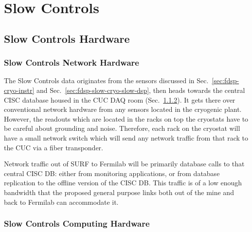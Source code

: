 \section{Slow Controls}
\label{sec:fdsp-slow-cryo-ctrl}




\subsection{Slow Controls Hardware}
\label{sec:fdsp-slow-cryo-hdwr}

\subsubsection{Slow Controls Network Hardware}
\label{sec:fdsp-slow-cryo-slow-network}
The Slow Controls data originates from the sensors discussed in
Sec.~\ref{sec:fdsp-cryo-instr} and
Sec.~\ref{sec:fdsp-slow-cryo-slow-dsp}, then heads towards the central
CISC database housed in the CUC DAQ room
(Sec.~\ref{sec:fdsp-slow-cryo-slow-compute}).  It gets there over
conventional network hardware from any sensors located in the cryogenic
plant.  However, the readouts which are located in the racks on top the
cryostats have to be careful about grounding and noise.  Therefore, each
rack on the cryostat will have a small network switch which will send
any network traffic from that rack to the CUC via a fiber transponder.

Network traffic out of SURF to Fermilab will be primarily database calls
to that central CISC DB: either from monitoring applications, or from
database replication to the offline version of the CISC DB.  This
traffic is of a low enough bandwidth that the proposed general purpose
links both out of the mine and back to Fermilab can accommodate it.

\subsubsection{Slow Controls Computing Hardware}
\label{sec:fdsp-slow-cryo-slow-compute}

